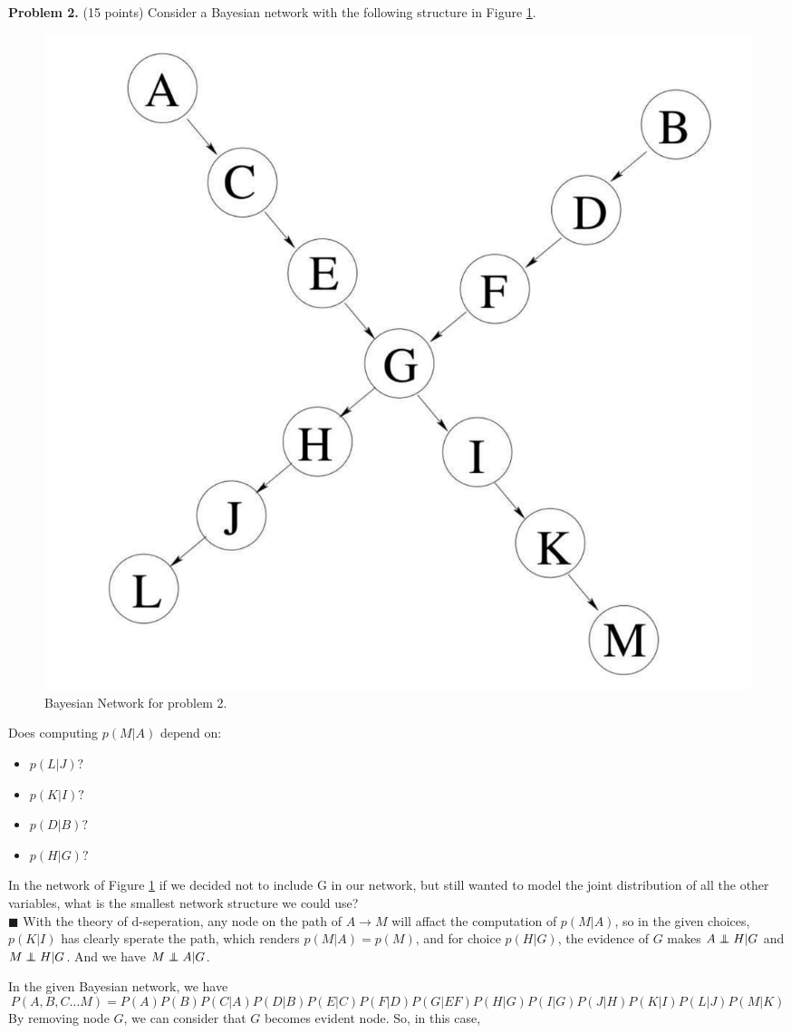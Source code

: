 \documentclass{article}
\newcommand{\solution}[1]{~\\ $\blacksquare$ \sffamily\upshape\selectfont #1
\normalfont ~\\~ }
\newcommand\independent{\protect\mathpalette{\protect\independenT}{\perp}}
\def\independenT#1#2{\mathrel{\rlap{$#1#2$}\mkern2mu{#1#2}}}
\begin{document}
\textbf{Problem 2.} (15 points) Consider a Bayesian network with the
following structure in Figure \ref{fig:final_2.1}.
\begin{figure}[ht]
  \centering
  \includegraphics[width=.5\textwidth]{AI-FINAL-2_1.pdf}
  \caption{Bayesian Network for problem 2.}\label{fig:final_2.1}
\end{figure}
Does computing $p(M|A)$ depend on:
\begin{itemize}
  \item $p(L|J)?$
  \item $p(K|I)?$
  \item $p(D|B)?$
  \item $p(H|G)?$
\end{itemize}
In the network of Figure \ref{fig:final_2.1} if we decided not to
include G in our network, but still wanted to model the joint
distribution of all the other variables, what is the smallest network
structure we could use?
\solution{
  With the theory of d-seperation, any node on the path of $A\rightarrow M$
  will affact the computation of $p(M|A)$, so in the given choices,
  $p(K|I)$ has clearly sperate the path, which renders $p(M|A) =
  p(M)$, and for choice $p(H|G)$, the evidence of $G$ makes
  $A\independent H | G$ and $M\independent H | G$. And we have 
  $M\independent A | G$. 

  In the given Bayesian network, we have 
  \[ P(A,B,C...M) = P(A)P(B)P(C|A)P(D|B)P(E|C)P(F|D)
  P(G|EF)P(H|G)P(I|G)P(J|H)P(K|I)P(L|J)P(M|K) \]
  By removing node $G$, we can consider that $G$ becomes evident
  node. So, in this case, 
}
\end{document}
